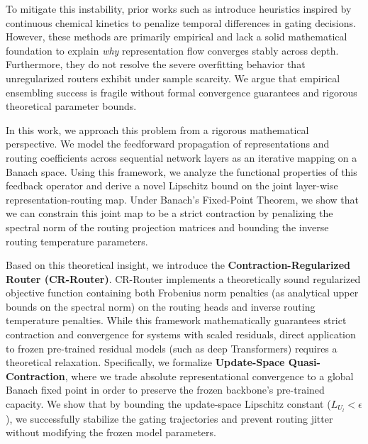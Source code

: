 To mitigate this instability, prior works such as \cite{chemmerge2025kinetics} introduce heuristics inspired by continuous chemical kinetics to penalize temporal differences in gating decisions. However, these methods are primarily empirical and lack a solid mathematical foundation to explain \emph{why} representation flow converges stably across depth. Furthermore, they do not resolve the severe overfitting behavior that unregularized routers exhibit under sample scarcity. We argue that empirical ensembling success is fragile without formal convergence guarantees and rigorous theoretical parameter bounds.

In this work, we approach this problem from a rigorous mathematical perspective. We model the feedforward propagation of representations and routing coefficients across sequential network layers as an iterative mapping on a Banach space. Using this framework, we analyze the functional properties of this feedback operator and derive a novel Lipschitz bound on the joint layer-wise representation-routing map. Under Banach's Fixed-Point Theorem, we show that we can constrain this joint map to be a strict contraction by penalizing the spectral norm of the routing projection matrices and bounding the inverse routing temperature parameters. 

Based on this theoretical insight, we introduce the \textbf{Contraction-Regularized Router (CR-Router)}. CR-Router implements a theoretically sound regularized objective function containing both Frobenius norm penalties (as analytical upper bounds on the spectral norm) on the routing heads and inverse routing temperature penalties. 
While this framework mathematically guarantees strict contraction and convergence for systems with scaled residuals, direct application to frozen pre-trained residual models (such as deep Transformers) requires a theoretical relaxation. Specifically, we formalize \textbf{Update-Space Quasi-Contraction}, where we trade absolute representational convergence to a global Banach fixed point in order to preserve the frozen backbone's pre-trained capacity. We show that by bounding the update-space Lipschitz constant ($L_{U_l} < \epsilon$), we successfully stabilize the gating trajectories and prevent routing jitter without modifying the frozen model parameters.

